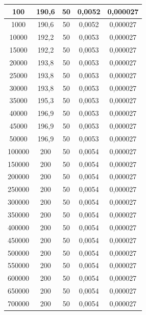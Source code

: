 \begin{table}[!ht]
\begin{tabular}{|c|c|c|c|c|}
      
        100 & 190,6 & 50 & 0,0052 & 0,000027 \\ \hline
        1000 & 190,6 & 50 & 0,0052 & 0,000027 \\ \hline
        10000 & 192,2 & 50 & 0,0053 & 0,000027 \\ \hline
        15000 & 192,2 & 50 & 0,0053 & 0,000027 \\ \hline
        20000 & 193,8 & 50 & 0,0053 & 0,000027 \\ \hline
        25000 & 193,8 & 50 & 0,0053 & 0,000027 \\ \hline
        30000 & 193,8 & 50 & 0,0053 & 0,000027 \\ \hline
        35000 & 195,3 & 50 & 0,0053 & 0,000027 \\ \hline
        40000 & 196,9 & 50 & 0,0053 & 0,000027 \\ \hline
        45000 & 196,9 & 50 & 0,0053 & 0,000027 \\ \hline
        50000 & 196,9 & 50 & 0,0053 & 0,000027 \\ \hline
        100000 & 200 & 50 & 0,0054 & 0,000027 \\ \hline
        150000 & 200 & 50 & 0,0054 & 0,000027 \\ \hline
        200000 & 200 & 50 & 0,0054 & 0,000027 \\ \hline
        250000 & 200 & 50 & 0,0054 & 0,000027 \\ \hline
        300000 & 200 & 50 & 0,0054 & 0,000027 \\ \hline
        350000 & 200 & 50 & 0,0054 & 0,000027 \\ \hline
        400000 & 200 & 50 & 0,0054 & 0,000027 \\ \hline
        450000 & 200 & 50 & 0,0054 & 0,000027 \\ \hline
        500000 & 200 & 50 & 0,0054 & 0,000027 \\ \hline
        550000 & 200 & 50 & 0,0054 & 0,000027 \\ \hline
        600000 & 200 & 50 & 0,0054 & 0,000027 \\ \hline
        650000 & 200 & 50 & 0,0054 & 0,000027 \\ \hline
        700000 & 200 & 50 & 0,0054 & 0,000027 \\ \hline									
        
    \end{tabular}
\end{table}

